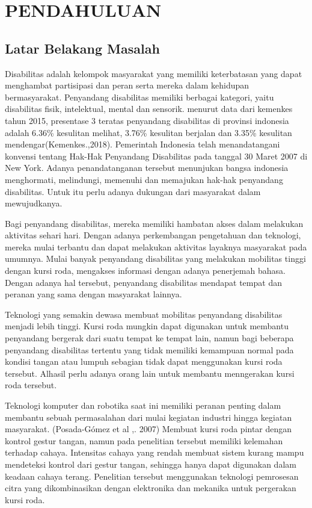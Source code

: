 \chapter{PENDAHULUAN}
\section{Latar Belakang Masalah}
Disabilitas adalah kelompok masyarakat yang memiliki keterbatasan yang dapat menghambat partisipasi dan peran serta mereka dalam kehidupan bermasyarakat. Penyandang disabilitas memiliki berbagai kategori, yaitu disabilitas fisik, intelektual, mental dan sensorik.
menurut data dari kemenkes tahun 2015, presentase 3 teratas penyandang disabilitas di provinsi indonesia adalah 6.36\% kesulitan melihat, 3.76\% kesulitan berjalan dan 3.35\% kesulitan mendengar(Kemenkes.,2018). Pemerintah Indonesia telah menandatangani konvensi tentang Hak-Hak Penyandang Disabilitas pada tanggal 30 Maret 2007 di New York. Adanya penandatanganan tersebut menunjukan bangsa indonesia menghormati, melindungi, memenuhi dan memajukan hak-hak penyandang disabilitas. Untuk itu perlu adanya dukungan dari masyarakat dalam mewujudkanya. 

Bagi penyandang disabilitas, mereka memiliki hambatan akses dalam melakukan aktivitas sehari hari. Dengan adanya perkembangan pengetahuan dan teknologi, mereka mulai terbantu dan dapat melakukan aktivitas layaknya masyarakat pada umumnya.
Mulai banyak penyandang disabilitas yang melakukan mobilitas tinggi dengan kursi roda, mengakses informasi dengan adanya penerjemah bahasa. Dengan adanya hal tersebut, penyandang disabilitas mendapat tempat dan peranan yang sama dengan masyarakat lainnya.

Teknologi yang semakin dewasa membuat mobilitas penyandang disabilitas menjadi lebih tinggi. Kursi roda mungkin dapat digunakan untuk membantu penyandang bergerak dari suatu tempat ke tempat lain, namun bagi beberapa penyandang disabilitas tertentu yang tidak memiliki kemampuan normal pada kondisi tangan atau lumpuh sebagian tidak dapat menggunakan kursi roda tersebut. Alhasil perlu adanya orang lain untuk membantu menngerakan kursi roda tersebut. 

Teknologi komputer dan robotika saat ini memiliki peranan penting dalam membantu sebuah permasalahan dari mulai kegiatan industri hingga kegiatan masyarakat. (Posada-Gómez et al ,. 2007) Membuat kursi roda pintar dengan kontrol gestur tangan, namun pada penelitian tersebut memiliki kelemahan terhadap cahaya. Intensitas cahaya yang rendah membuat sistem kurang mampu mendeteksi kontrol dari gestur tangan, sehingga hanya dapat digunakan dalam keadaan cahaya terang. Penelitian tersebut menggunakan teknologi pemrosesan citra yang dikombinasikan dengan elektronika dan mekanika untuk pergerakan kursi roda.

